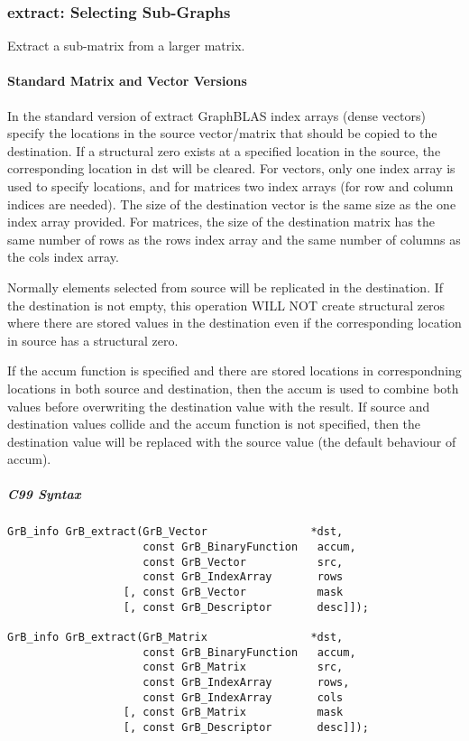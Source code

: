 \subsubsection{{\sf extract}: Selecting Sub-Graphs}

Extract a sub-matrix from a larger matrix. 

\paragraph{Standard Matrix and Vector Versions}

In the standard version of {\sf extract} GraphBLAS index arrays (dense vectors)
specify the locations in the source vector/matrix that should be copied to the
destination.  If a structural zero exists at a specified location in the source,
the corresponding location in dst will be cleared.  For vectors, only one index array is used to specify
locations, and for matrices two index arrays (for row and column indices are needed).
The size of the destination vector is the same size as the one index array provided.
For matrices, the size of the destination matrix has the same number of rows as the
{\sf rows} index array and the same number of columns as the {\sf cols} index array.

Normally elements selected from source will be replicated in the destination.  If the
destination is not empty, this operation WILL NOT create structural zeros where there
are stored values in the destination even if the corresponding location in source has
a structural zero.

If the {\sf accum} function is specified and there are stored locations in correspondning
locations in both source and destination, then the
{\sf accum} is used to combine both values before overwriting the destination value
with the result.  If source and destination values collide and the {\sf accum} function is
not specified, then the destination value will be replaced with the source value (the
default behaviour of {\sf accum}).

\subparagraph{C99 Syntax}

\begin{verbatim}
GrB_info GrB_extract(GrB_Vector                *dst,
                     const GrB_BinaryFunction   accum,
                     const GrB_Vector           src,
                     const GrB_IndexArray       rows
                  [, const GrB_Vector           mask
                  [, const GrB_Descriptor       desc]]);
                  
GrB_info GrB_extract(GrB_Matrix                *dst,
                     const GrB_BinaryFunction   accum,
                     const GrB_Matrix           src,
                     const GrB_IndexArray       rows,
                     const GrB_IndexArray       cols
                  [, const GrB_Matrix           mask
                  [, const GrB_Descriptor       desc]]);
\end{verbatim}

